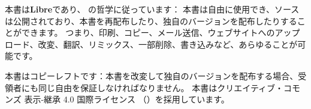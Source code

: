 \lettrine[lraise=-0.03,loversize=0.08]{本}{書は}\textbf{Libre}であり、
の哲学に従っています：
本書は自由に使用でき、ソースは公開されており、本書を再配布したり、独自のバージョンを配布したりすることができます。
つまり、印刷、コピー、メール送信、ウェブサイトへのアップロード、改変、翻訳、リミックス、一部削除、書き込みなど、あらゆることが可能です。

本書はコピーレフトです：本書を改変して独自のバージョンを配布する場合、受領者にも同じ自由を保証しなければなりません。
本書はクリエイティブ・コモンズ 表示-継承 4.0 国際ライセンス
（\href{http://creativecommons.org/licenses/by-sa/4.0/}{}）を採用しています。
